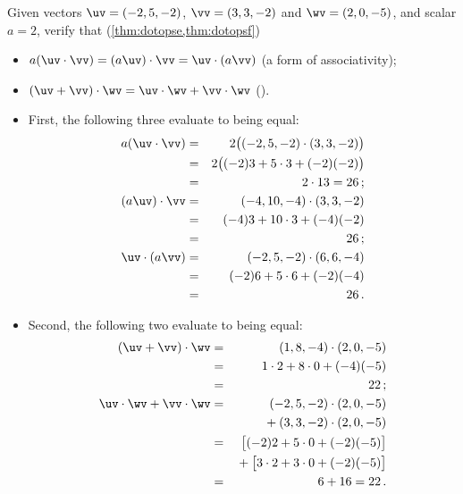 \begin{example} 
Given vectors \(\uv=(-2,5,-2)\), \(\vv=(3,3,-2)\) and \(\wv=(2,0,-5)\), and  scalar \(a=2\), verify that (\cref{thm:dotopse,thm:dotopsf})
\begin{itemize}
\item \(a(\uv\cdot\vv)=(a\uv)\cdot\vv=\uv\cdot(a\vv)\) (a form of associativity);
\item \((\uv+\vv)\cdot\wv=\uv\cdot\wv+\vv\cdot\wv\) ().
\end{itemize}
\begin{solution} 
\begin{itemize}
\item First, the following three evaluate to being equal:
\begin{eqnarray*}
a(\uv\cdot\vv)&=&2\big((-2,5,-2)\cdot(3,3,-2)\big)
\\&=&2\big((-2)3+5\cdot3+(-2)(-2)\big)
\\&=&2\cdot13=26\,;
\\(a\uv)\cdot\vv&=&(-4,10,-4)\cdot(3,3,-2)
\\&=&(-4)3+10\cdot3+(-4)(-2)
\\&=&26\,;
\\\uv\cdot(a\vv)&=&(-2,5,-2)\cdot(6,6,-4)
\\&=&(-2)6+5\cdot6+(-2)(-4)
\\&=&26\,.
\end{eqnarray*}

\item Second, the following two evaluate to being equal:
\begin{eqnarray*}
(\uv+\vv)\cdot\wv&=&(1,8,-4)\cdot(2,0,-5)
\\&=&1\cdot2+8\cdot0+(-4)(-5)
\\&=&22\,;
\\\uv\cdot\wv+\vv\cdot\wv&=&
(-2,5,-2)\cdot(2,0,-5)
\\&&{}
+(3,3,-2)\cdot(2,0,-5)
\\&=&\big[(-2)2+5\cdot0+(-2)(-5)\big]
\\&&{}
+\big[3\cdot2+3\cdot0+(-2)(-5)\big]
\\&=&6+16=22\,.
\end{eqnarray*}
\end{itemize}
\end{solution}
\end{example}




